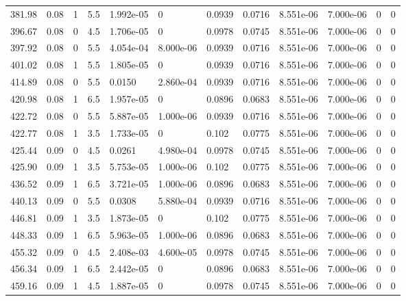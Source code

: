 \documentclass[preview]{standalone}
\begin{document}
{{{\begin{tabular}{L{1.2cm}C{1.2cm} C{0.3cm}C{0.5cm} C{1.4cm}C{1.4cm} C{1.4cm}C{1.4cm} C{1.6cm}C{1.6cm} C{1.6cm}C{1.6cm}}
  381.98  &  0.08  & 1     & 5.5 &  1.992e-05  & 0  &  0.0939&   0.0716& 8.551e-06 & 7.000e-06   &  0 & 0  \\ 
  396.67  &  0.08  & 0     & 4.5 &  1.706e-05  & 0  &  0.0978&   0.0745& 8.551e-06 & 7.000e-06   &  0 & 0  \\ 
  397.92  &  0.08  & 0     & 5.5 &  4.054e-04  & 8.000e-06  &  0.0939&   0.0716& 8.551e-06 & 7.000e-06   &  0 & 0  \\ 
  401.02  &  0.08  & 1     & 5.5 &  1.805e-05  & 0  &  0.0939&   0.0716& 8.551e-06 & 7.000e-06   &  0 & 0  \\ 
  414.89  &  0.08  & 0     & 5.5 &  0.0150  & 2.860e-04  &  0.0939&   0.0716& 8.551e-06 & 7.000e-06   &  0 & 0  \\ 
  420.98  &  0.08  & 1     & 6.5 &  1.957e-05  & 0  &  0.0896&   0.0683& 8.551e-06 & 7.000e-06   &  0 & 0  \\ 
  422.72  &  0.08  & 0     & 5.5 &  5.887e-05  & 1.000e-06  &  0.0939&   0.0716& 8.551e-06 & 7.000e-06   &  0 & 0  \\ 
  422.77  &  0.08  & 1     & 3.5 &  1.733e-05  & 0  &  0.102&   0.0775& 8.551e-06 & 7.000e-06   &  0 & 0  \\ 
  425.44  &  0.09  & 0     & 4.5 &  0.0261  & 4.980e-04  &  0.0978&   0.0745& 8.551e-06 & 7.000e-06   &  0 & 0  \\ 
  425.90  &  0.09  & 1     & 3.5 &  5.753e-05  & 1.000e-06  &  0.102&   0.0775& 8.551e-06 & 7.000e-06   &  0 & 0  \\ 
  436.52  &  0.09  & 1     & 6.5 &  3.721e-05  & 1.000e-06  &  0.0896&   0.0683& 8.551e-06 & 7.000e-06   &  0 & 0  \\ 
  440.13  &  0.09  & 0     & 5.5 &  0.0308  & 5.880e-04  &  0.0939&   0.0716& 8.551e-06 & 7.000e-06   &  0 & 0  \\ 
  446.81  &  0.09  & 1     & 3.5 &  1.873e-05  & 0  &  0.102&   0.0775& 8.551e-06 & 7.000e-06   &  0 & 0  \\ 
  448.33  &  0.09  & 1     & 6.5 &  5.963e-05  & 1.000e-06  &  0.0896&   0.0683& 8.551e-06 & 7.000e-06   &  0 & 0  \\ 
  455.32  &  0.09  & 0     & 4.5 &  2.408e-03  & 4.600e-05  &  0.0978&   0.0745& 8.551e-06 & 7.000e-06   &  0 & 0  \\ 
  456.34  &  0.09  & 1     & 6.5 &  2.442e-05  & 0  &  0.0896&   0.0683& 8.551e-06 & 7.000e-06   &  0 & 0  \\ 
  459.16  &  0.09  & 1     & 4.5 &  1.887e-05  & 0  &  0.0978&   0.0745& 8.551e-06 & 7.000e-06   &  0 & 0  \\ 

\end{tabular}}}}
\end{document}

